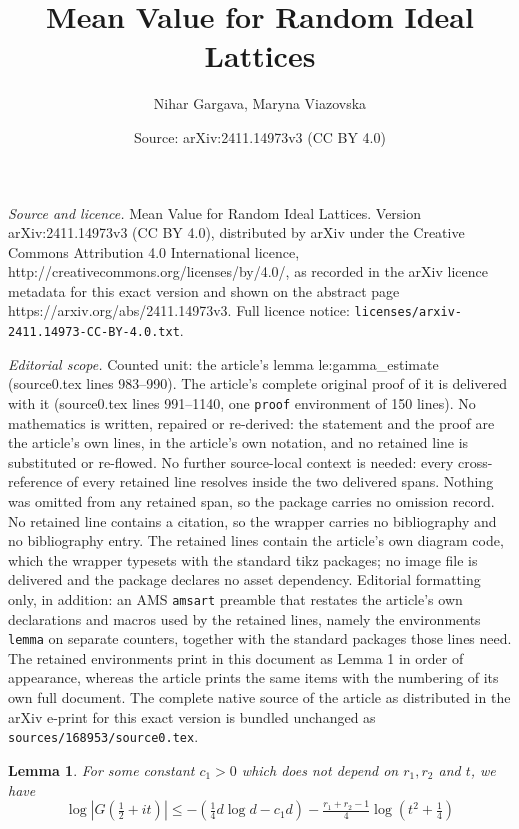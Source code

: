 \documentclass[10pt,a4paper]{amsart}
\title{Mean Value for Random Ideal Lattices}
\author{Nihar Gargava, Maryna Viazovska}
\date{Source: arXiv:2411.14973v3 (CC BY 4.0)}
\newtheorem{lemma}{Lemma}
\begin{document}
\maketitle

\noindent\emph{Source and licence.} Mean Value for Random Ideal Lattices. Version arXiv:2411.14973v3 (CC BY 4.0), distributed by arXiv under the Creative Commons Attribution 4.0 International licence, http://creativecommons.org/licenses/by/4.0/, as recorded in the arXiv licence metadata for this exact version and shown on the abstract page https://arxiv.org/abs/2411.14973v3. Full licence notice: \texttt{licenses/arxiv-2411.14973-CC-BY-4.0.txt}.\par\smallskip

\noindent\textit{Editorial scope.} Counted unit: the article's lemma le:gamma\_estimate (source0.tex lines 983--990). The article's complete original proof of it is delivered with it (source0.tex lines 991--1140, one \texttt{proof} environment of 150 lines). No mathematics is written, repaired or re-derived: the statement and the proof are the article's own lines, in the article's own notation, and no retained line is substituted or re-flowed.  No further source-local context is needed: every cross-reference of every retained line resolves inside the two delivered spans.  Nothing was omitted from any retained span, so the package carries no omission record.  No retained line contains a citation, so the wrapper carries no bibliography and no bibliography entry.  The retained lines contain the article's own diagram code, which the wrapper typesets with the standard tikz packages; no image file is delivered and the package declares no asset dependency.  Editorial formatting only, in addition: an AMS \texttt{amsart} preamble that restates the article's own declarations and macros used by the retained lines, namely the environments \texttt{lemma} on separate counters, together with the standard packages those lines need.  The retained environments print in this document as Lemma 1 in order of appearance, whereas the article prints the same items with the numbering of its own full document.  The complete native source of the article as distributed in the arXiv e-print for this exact version is bundled unchanged as \texttt{sources/168953/source0.tex}.
\begin{lemma}
  \label{le:gamma_estimate}
For some constant $c_{1}>0$ which does not depend on $r_{1},r_{2}$ and $t$, we have
\begin{equation}
	\log\left| {    G(\tfrac{1}{2} + i t) }\right|  
    \leq  - \left(\tfrac{1}{4} d \log d - c_{1} d \right)  - \tfrac{r_{1}+r_{2}-1}{4}\log\left( t^{2} + \tfrac{1}{4}\right)
\end{equation}
\end{lemma}
\end{document}
